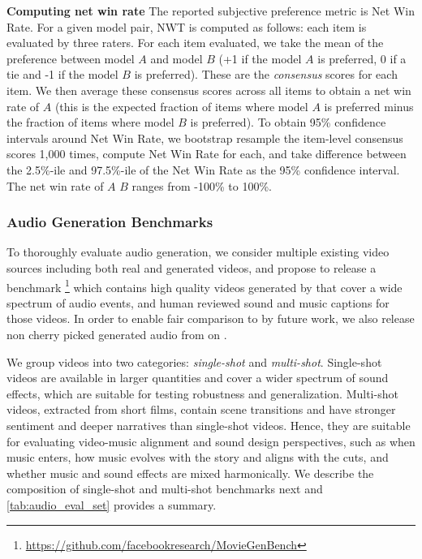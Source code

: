 \noindent\textbf{Computing net win rate}
The reported subjective preference metric is Net Win Rate.
For a given model pair, NWT is computed as follows: each item is evaluated by three raters.
For each item evaluated, we take the mean of the preference between model $A$ and model $B$ (+1 if the model $A$ is preferred, 0 if a tie and -1 if the model $B$ is preferred).
These are the \textit{consensus} scores for each item.
We then average these consensus scores across all items to obtain a net win rate of $A$ (this is the expected fraction of items where model $A$ is preferred minus the fraction of items where model $B$ is preferred).
To obtain 95\% confidence intervals around Net Win Rate, we bootstrap resample the item-level consensus scores 1,000 times,
compute Net Win Rate for each, and take difference between the 2.5\%-ile and 97.5\%-ile of the Net Win Rate as the 95\% confidence interval.
The net win rate of $A$ \vs $B$ ranges from -100\% to 100\%.

\subsubsection{Audio Generation Benchmarks}
\label{subsubsec:audio_gen_bench}
To thoroughly evaluate audio generation, we consider multiple existing video sources including both real and generated videos,
and propose to release a benchmark \OursAudioBench\footnote{\url{https://github.com/facebookresearch/MovieGenBench}} which contains high quality videos generated by \OursVideo that cover a wide spectrum of audio events, and human reviewed sound and music captions for those videos.
In order to enable fair comparison to \OursAudio by future work, we also release non cherry picked generated audio from \OursAudio on \OursAudioBench.

We group videos into two categories: \textit{single-shot} and \textit{multi-shot}.
Single-shot videos are available in larger quantities and cover a wider spectrum of sound effects,
which are suitable for testing robustness and generalization.
Multi-shot videos, extracted from short films, contain scene transitions and have stronger sentiment and deeper narratives than single-shot videos.
Hence, they are suitable for evaluating video-music alignment and sound design perspectives,
such as when music enters, how music evolves with the story and aligns with the cuts, and whether music and sound effects are mixed harmonically.
We describe the composition of single-shot and multi-shot benchmarks next and \cref{tab:audio_eval_set} provides a summary.

